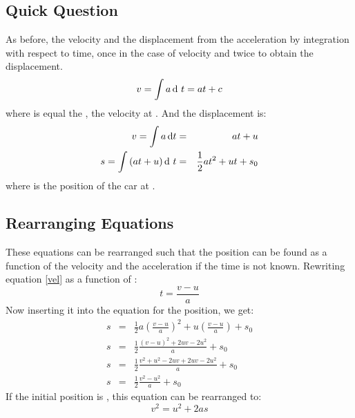 \subsection*{Quick Question}
As before, the velocity and the displacement from the acceleration by integration with respect to time, once in the case of velocity and twice to obtain the displacement.
\begin{equation}
v = \int a \d\ t = at + c
\end{equation}
where  is equal the , the velocity at . And the displacement is:
\begin{eqnarray}
v = \int a \operatorname{d}\! t &=& at + u \label{vel} \\ 
s = \int \left(at + u\right) \operatorname{d}\!\ t &=& \frac{1}{2} a t^2 + u t + s_0 \label{s}
\end{eqnarray}
where  is the position of the car at . 

\subsection{Rearranging Equations}
These equations can be rearranged such that the position can be found as a function of the velocity and the acceleration if the time is not known. Rewriting equation \ref{vel} as a function of :
\begin{equation}
t = \frac{v-u}{a}
\end{equation}
Now inserting it into the equation for the position, we get:
\begin{eqnarray}
s &=& \frac{1}{2} a \left(\frac{v-u}{a}\right)^2 + u\left(\frac{v-u}{a}\right) + s_0\nonumber \\
s &=& \frac{1}{2}\frac{(v-u)^2 + 2uv - 2u^2}{a} + s_0 \nonumber\\
s &=& \frac{1}{2}\frac{v^2 + u^2 - 2uv + 2uv - 2u^2}{a} + s_0 \nonumber\\
s &=& \frac{1}{2} \frac{v^2 - u^2}{a} + s_0
\end{eqnarray}
If the initial position is , this equation can be rearranged to:
\begin{equation}
v^2 = u^2 + 2as
\end{equation}

 
 
